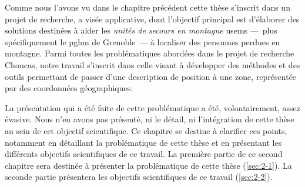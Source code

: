 Comme nous l'avons vu dans le chapitre précédent cette thèse s'inscrit
dans un projet de recherche, a visée applicative, dont l'objectif
principal est d’élaborer des solutions destinées à aider les
\emph{unités de secours en montagne} \acp{usem} ---~plus
spécifiquement le \ac{pghm} de Grenoble~--- à localiser des personnes
perdues en montagne. Parmi toutes les problématiques abordées dans le
projet de recherche Choucas, notre travail s'inscrit dans celle visant
à développer des méthodes et des outils permettant de passer d'une
description de position à une zone, représentée par des coordonnées
géographiques.

La présentation qui a été faite de cette problématique a été,
volontairement, assez évasive. Nous n'en avons pas présenté, ni le
détail, ni l'intégration de cette thèse au sein de cet objectif
scientifique. Ce chapitre se destine à clarifier ces points, notamment
en détaillant la problématique de cette thèse et en présentant les
différents objectifs scientifiques de ce travail.
%
La première partie de ce second chapitre sera destinée à présenter la
problématique de cette thèse (\autoref{sec:2-1}). La seconde partie
présentera les objectifs scientifiques de ce travail
(\autoref{sec:2-2}).

